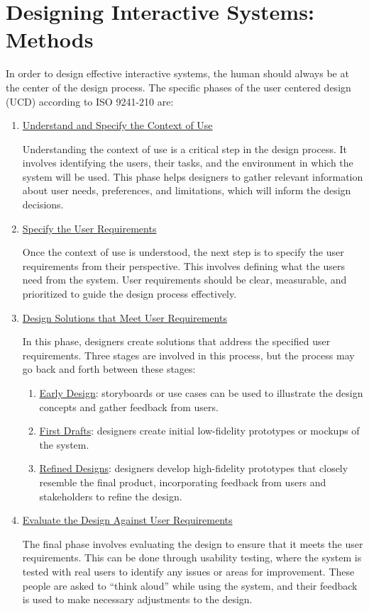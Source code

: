 \chapter{Designing Interactive Systems: Methods}

In order to design effective interactive systems, the human should always be at the center of the design process. The specific phases of the user centered design (UCD) according to ISO 9241-210 are:
\begin{enumerate}
    \item \ul{Understand and Specify the Context of Use}
    
    Understanding the context of use is a critical step in the design process. It involves identifying the users, their tasks, and the environment in which the system will be used. This phase helps designers to gather relevant information about user needs, preferences, and limitations, which will inform the design decisions.
    \item \ul{Specify the User Requirements}
    
    Once the context of use is understood, the next step is to specify the user requirements from their perspective. This involves defining what the users need from the system. User requirements should be clear, measurable, and prioritized to guide the design process effectively.
    \item \ul{Design Solutions that Meet User Requirements}
    
    In this phase, designers create solutions that address the specified user requirements. Three stages are involved in this process, but the process may go back and forth between these stages:
    \begin{enumerate}
        \item \ul{Early Design}: storyboards or use cases can be used to illustrate the design concepts and gather feedback from users.
        \item \ul{First Drafts}: designers create initial low-fidelity prototypes or mockups of the system.
        \item \ul{Refined Designs}: designers develop high-fidelity prototypes that closely resemble the final product, incorporating feedback from users and stakeholders to refine the design.
    \end{enumerate}
    \item \ul{Evaluate the Design Against User Requirements}
    
    The final phase involves evaluating the design to ensure that it meets the user requirements. This can be done through usability testing, where the system is tested with real users to identify any issues or areas for improvement. These people are asked to ``think aloud'' while using the system, and their feedback is used to make necessary adjustments to the design.
\end{enumerate}

